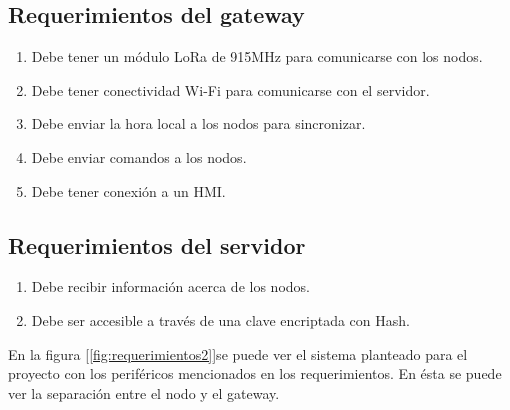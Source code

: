 \subsection{Requerimientos del gateway}

\begin{enumerate}
	\item	Debe tener un módulo LoRa de 915MHz para comunicarse con los nodos.
	\item	Debe tener conectividad Wi-Fi para comunicarse con el servidor.
	\item	Debe enviar la hora local a los nodos para sincronizar.
	\item	Debe enviar comandos a los nodos.
	\item	Debe tener conexión a un HMI.
\end{enumerate}

\subsection{Requerimientos del servidor}

\begin{enumerate}
	\item	Debe recibir información acerca de los nodos.
	\item	Debe ser accesible a través de una clave encriptada con Hash.
\end{enumerate}

En la figura [\ref{fig:requerimientos2}]se puede ver el sistema planteado para el proyecto con los periféricos mencionados en los requerimientos. En ésta se puede ver la separación entre el nodo y el gateway.

